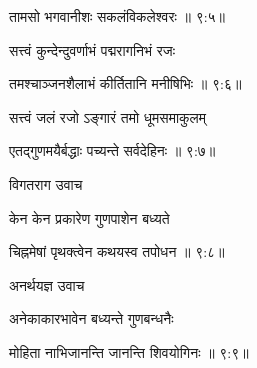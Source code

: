 
{\devanagarifont तामसो भगवानीशः सकलंविकलेश्वरः {॥ ९:५॥} \veg\dontdisplaylinenum }%

{\devanagarifont सत्त्वं कुन्देन्दुवर्णाभं पद्मरागनिभं रजः \thinspace{\dandab} \dontdisplaylinenum }%


{\devanagarifont तमश्चाञ्जनशैलाभं कीर्तितानि मनीषिभिः {॥ ९:६॥} \veg\dontdisplaylinenum }%

{\devanagarifont सत्त्वं जलं रजो ऽङ्गारं तमो धूमसमाकुलम् \thinspace{\dandab} \dontdisplaylinenum }%


{\devanagarifont एतद्गुणमयैर्बद्धाः पच्यन्ते सर्वदेहिनः {॥ ९:७॥} \veg\dontdisplaylinenum }%

{\devanagarifont विगतराग उवाच {\dandab}\dontdisplaylinenum  }%
 
{\devanagarifont केन केन प्रकारेण गुणपाशेन बध्यते \thinspace{\danda} \dontdisplaylinenum }%


{\devanagarifont चिह्नमेषां पृथक्त्वेन कथयस्व तपोधन {॥ ९:८॥} \veg\dontdisplaylinenum }%

{\devanagarifont अनर्थयज्ञ उवाच {\dandab}\dontdisplaylinenum  }%
 
{\devanagarifont अनेकाकारभावेन बध्यन्ते गुणबन्धनैः \thinspace{\danda} \dontdisplaylinenum }%
 

{\devanagarifont मोहिता नाभिजानन्ति जानन्ति शिवयोगिनः {॥ ९:९॥} \veg\dontdisplaylinenum }%

